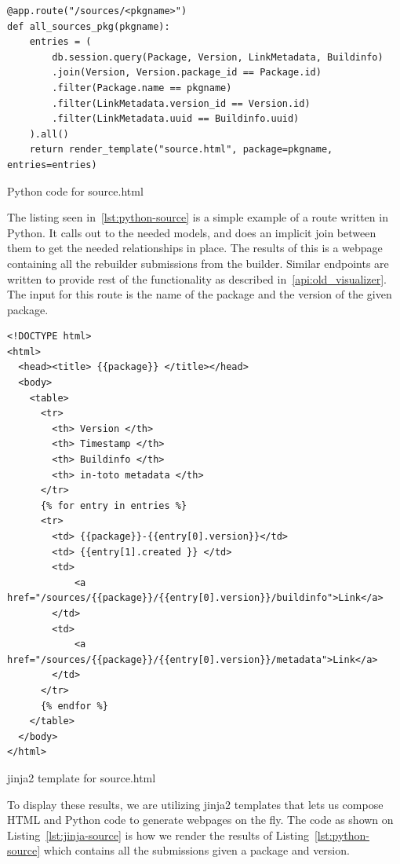 \documentclass[../Main/thesis.tex]{subfiles}
\begin{document}
\begin{listing}[htpb]
\begin{verbatim}
@app.route("/sources/<pkgname>")
def all_sources_pkg(pkgname):
    entries = (
        db.session.query(Package, Version, LinkMetadata, Buildinfo)
        .join(Version, Version.package_id == Package.id)
        .filter(Package.name == pkgname)
        .filter(LinkMetadata.version_id == Version.id)
        .filter(LinkMetadata.uuid == Buildinfo.uuid)
    ).all()
    return render_template("source.html", package=pkgname, entries=entries)
\end{verbatim}
\caption{Python code for source.html}
\label{lst:python-source}
\end{listing}

The listing seen in~\ref{lst:python-source} is a simple example of a route
written in Python. It calls out to the needed models, and does an implicit join
between them to get the needed relationships in place. The results of this is a
webpage containing all the rebuilder submissions from the builder. Similar
endpoints are written to provide rest of the functionality as described
in~\ref{api:old_visualizer}. The input for this route is the name of the package
and the version of the given package.


\begin{listing}[H]
\begin{verbatim}
<!DOCTYPE html>
<html>
  <head><title> {{package}} </title></head>
  <body>
    <table>
      <tr>
        <th> Version </th>
        <th> Timestamp </th>
        <th> Buildinfo </th>
        <th> in-toto metadata </th>
      </tr>
      {% for entry in entries %}
      <tr>
        <td> {{package}}-{{entry[0].version}}</td>
        <td> {{entry[1].created }} </td>
        <td> 
            <a href="/sources/{{package}}/{{entry[0].version}}/buildinfo">Link</a>
        </td>
        <td> 
            <a href="/sources/{{package}}/{{entry[0].version}}/metadata">Link</a>
        </td>
      </tr>
      {% endfor %}
    </table>
  </body>
</html>
\end{verbatim}
\caption{jinja2 template for source.html}
\label{lst:jinja-source}
\end{listing}

To display these results, we are utilizing jinja2 templates that lets us compose
HTML and Python code to generate webpages on the fly. The code as shown on
Listing~\ref{lst:jinja-source} is how we render the results of
Listing~\ref{lst:python-source} which contains all the submissions given a
package and version.
\end{document}
